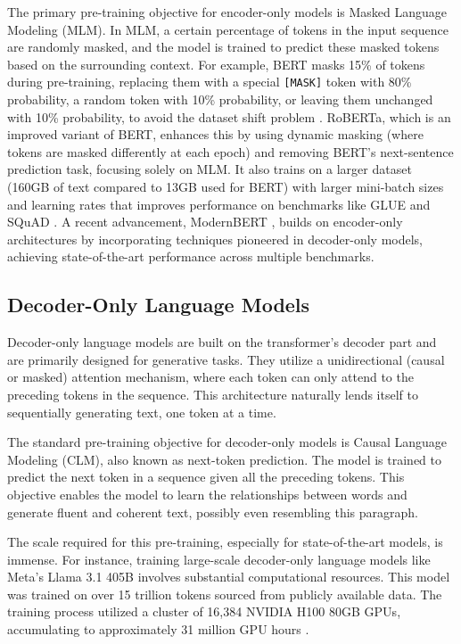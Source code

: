 The primary pre-training objective for encoder-only models is Masked Language Modeling (MLM). In MLM, a certain percentage of tokens in the input sequence are randomly masked, and the model is trained to predict these masked tokens based on the surrounding context. For example, BERT masks 15\% of tokens during pre-training, replacing them with a special \texttt{[MASK]} token with 80\% probability, a random token with 10\% probability, or leaving them unchanged with 10\% probability, to avoid the dataset shift problem \cite{devlin2018bert}. RoBERTa, which is an improved variant of BERT, enhances this by using dynamic masking (where tokens are masked differently at each epoch) and removing BERT's next-sentence prediction task, focusing solely on MLM. It also trains on a larger dataset (160GB of text compared to 13GB used for BERT) with larger mini-batch sizes and learning rates that improves performance on benchmarks like GLUE and SQuAD \cite{liu2019roberta}. A recent advancement, ModernBERT \cite{warner2024smarter}, builds on encoder-only architectures by incorporating techniques pioneered in decoder-only models, achieving state-of-the-art performance across multiple benchmarks.

\subsection{Decoder-Only Language Models}

Decoder-only language models are built on the transformer's \cite{vaswani2017attention} decoder part and are primarily designed for generative tasks. They utilize a unidirectional (causal or masked) attention mechanism, where each token can only attend to the preceding tokens in the sequence. This architecture naturally lends itself to sequentially generating text, one token at a time. 

The standard pre-training objective for decoder-only models is Causal Language Modeling (CLM), also known as next-token prediction. The model is trained to predict the next token in a sequence given all the preceding tokens. This objective enables the model to learn the relationships between words and generate fluent and coherent text, possibly even resembling this paragraph. %

The scale required for this pre-training, especially for state-of-the-art models, is immense. For instance, training large-scale decoder-only language models like Meta's Llama 3.1 405B involves substantial computational resources. This model was trained on over 15 trillion tokens sourced from publicly available data. The training process utilized a cluster of 16,384 NVIDIA H100 80GB GPUs, accumulating to approximately 31 million GPU hours \cite{grattafiori2024llama3herdmodels}.

